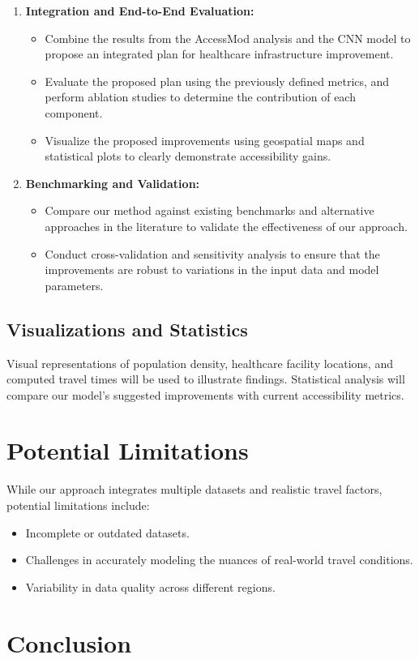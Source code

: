 \documentclass[11pt]{article}
\begin{document}
\begin{enumerate}
    \item \textbf{Integration and End-to-End Evaluation:}
    \begin{itemize}
        \item Combine the results from the AccessMod analysis and the CNN model to propose an integrated plan for healthcare infrastructure improvement.
        \item Evaluate the proposed plan using the previously defined metrics, and perform ablation studies to determine the contribution of each component.
        \item Visualize the proposed improvements using geospatial maps and statistical plots to clearly demonstrate accessibility gains.
    \end{itemize}

    \item \textbf{Benchmarking and Validation:}
    \begin{itemize}
        \item Compare our method against existing benchmarks and alternative approaches in the literature to validate the effectiveness of our approach.
        \item Conduct cross-validation and sensitivity analysis to ensure that the improvements are robust to variations in the input data and model parameters.
    \end{itemize}
\end{enumerate}


\subsection{Visualizations and Statistics}
Visual representations of population density, healthcare facility locations, and computed travel times will be used to illustrate findings. Statistical analysis will compare our model’s suggested improvements with current accessibility metrics.

\section{Potential Limitations}
While our approach integrates multiple datasets and realistic travel factors, potential limitations include:
\begin{itemize}
    \item Incomplete or outdated datasets.
    \item Challenges in accurately modeling the nuances of real-world travel conditions.
    \item Variability in data quality across different regions.
\end{itemize}

\section{Conclusion}




\end{document}
